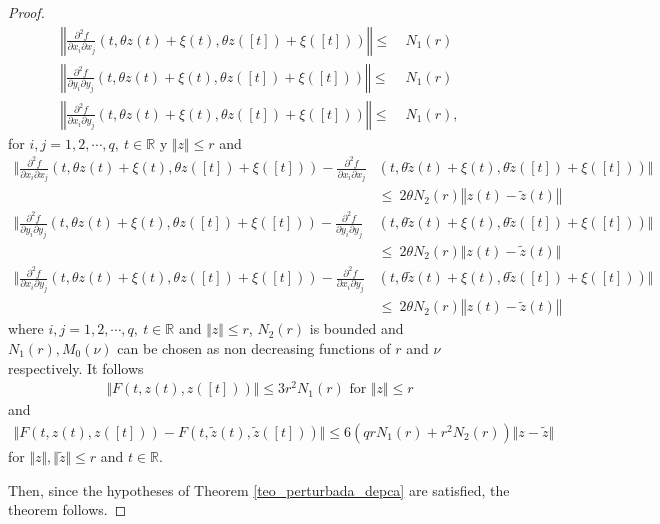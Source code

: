 \documentclass[english,,reqno]{amsart}
\numberwithin{equation}{section}
\newcommand{\bb}[1]{\mathbb{#1}}
\theoremstyle{plain}
\theoremstyle{definition}
\theoremstyle{remark}
\begin{document}
\begin{proof}
\[\begin{aligned}
\left\Vert\frac{\partial^{2}f}{\partial x_{i}\partial x_{j}}(t,\theta z(t)+\xi(t),\theta z([t])+\xi([t]))\right\Vert\leq &~{} N_{1}(r)\\
\left\Vert\frac{\partial^{2}f}{\partial y_{i}\partial y_{j}}(t,\theta z(t)+\xi(t),\theta z([t])+\xi([t]))\right\Vert\leq &~{} N_{1}(r)\\
\left\Vert\frac{\partial^{2}f}{\partial x_{i}\partial y_{j}}(t,\theta z(t)+\xi(t),\theta z([t])+\xi([t]))\right\Vert\leq &~{} N_{1}(r), 
\end{aligned}
\]
for $i,j=1,2,\cdots,q,\ t\in\bb{R}$ y $\Vert z\Vert\leq r$ and 
\[
\begin{aligned}
\bigg\Vert \frac{\partial^{2}f}{\partial x_{i}\partial x_{j}}(t,\theta z(t)+\xi(t),\theta z([t])+\xi([t])) -\frac{\partial^{2}f}{\partial x_{i}\partial x_{j}} & (t,\theta\tilde{z}(t)+\xi(t),\theta\tilde{z}([t])+\xi([t]))\bigg\Vert \\
&\leq~{}2\theta N_{2}(r)\left\Vert z(t)-\tilde{z}(t)\right\Vert
\\
\bigg\Vert \frac{\partial^{2}f}{\partial y_{i}\partial y_{j}}(t,\theta z(t)+\xi(t),\theta z([t])+\xi([t]))-\frac{\partial^{2}f}{\partial y_{i}\partial y_{j}}&(t,\theta\tilde{z}(t)+\xi(t),\theta\tilde{z}([t])+\xi([t]))\bigg\Vert \\
&\leq ~{} 2\theta N_{2}(r)\big\Vert z(t)-\tilde{z}(t)\big\Vert
\\
\bigg\Vert\frac{\partial^{2}f}{\partial x_{i}\partial y_{j}}(t,\theta z(t)+\xi(t),\theta z([t])+\xi([t]))-\frac{\partial^{2}f}{\partial x_{i}\partial y_{j}}&(t,\theta\tilde{z}(t)+\xi(t),\theta\tilde{z}([t])+\xi([t]))\bigg\Vert 
\\
&\leq~{} 2\theta N_{2}(r)\left\Vert z(t)-\tilde{z}(t)\right\Vert
\end{aligned}
\]
where $i,j=1,2,\cdots,q,\ t\in\bb{R}$ and $\Vert z\Vert\leq r$, $N_2(r)$ is bounded and $N_1(r),M_0(\nu)$ can be chosen as non decreasing functions of $r$ and $\nu$ respectively. It follows
\begin{eqnarray*}
\Vert F(t,z(t),z([t]))\Vert \leq 3r^{2}N_1(r) \mbox{ for } \Vert z\Vert\leq r
\end{eqnarray*}
and
\begin{eqnarray*}
\Vert F(t,z(t),z([t]))-F(t,\tilde{z}(t),\tilde{z}([t]))\Vert \leq 6(qrN_1(r)+r^{2}N_2(r))\Vert z-\tilde{z}\Vert
\end{eqnarray*}
for $\Vert z\Vert, \Vert\tilde{z} \Vert\leq r$ and $t\in \bb{R}$.

Then, since the hypotheses of Theorem \ref{teo_perturbada_depca} are satisfied, the theorem follows.

\end{proof}
\end{document}
